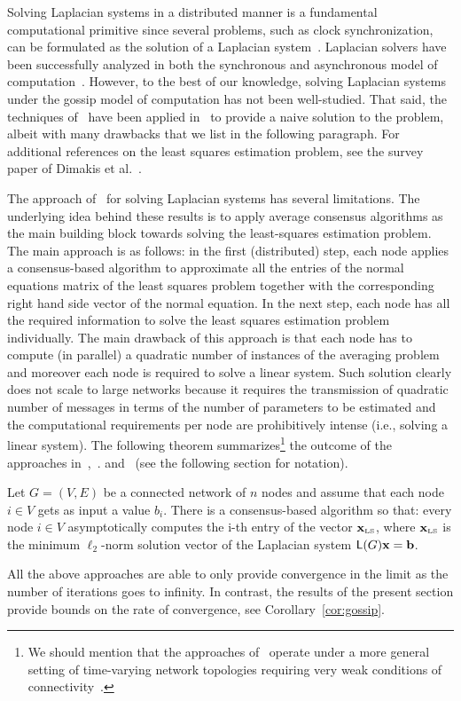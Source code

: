 Solving Laplacian systems in a distributed manner is a fundamental computational primitive since several problems, such as clock synchronization, can be formulated as the solution of a Laplacian system~\cite{smoothing,karp,CDC12}. Laplacian solvers have been successfully analyzed in both the synchronous and asynchronous model of computation~\cite{gossip:TBA86}. However, to the best of our knowledge, solving Laplacian systems under the gossip model of computation has not been well-studied. That said, the techniques of~\cite{gossip:Boyd} have been applied in~\cite{gossip:Bolognani,gossip:IPSN05_Boyd,gossip:IPSN06_LS} to provide a naive solution to the problem, albeit with many drawbacks that we list in the following paragraph. For additional references on the least squares estimation problem, see the survey paper of Dimakis et al.~\cite[\S~IV]{gossip:Dimakis}.

The approach of~\cite{gossip:Bolognani,gossip:IPSN05_Boyd,gossip:IPSN06_LS} for solving Laplacian systems has several limitations. The underlying idea behind these results is to apply average consensus algorithms as the main building block towards solving the least-squares estimation problem. The main approach is as follows: in the first (distributed) step, each node applies a consensus-based algorithm to approximate all the entries of the normal equations matrix of the least squares problem together with the corresponding right hand side vector of the normal equation. In the next step, each node has all the required information to solve the least squares estimation problem individually. The main drawback of this approach is that each node has to compute (in parallel) a quadratic number of instances of the averaging problem and moreover each node is required to solve a linear system. Such solution clearly does not scale to large networks because it requires the transmission of quadratic number of messages in terms of the number of parameters to be estimated and the computational requirements per node are prohibitively intense (i.e., solving a linear system).  The following theorem summarizes\footnote{We should mention that the approaches of~\cite{gossip:Bolognani,gossip:IPSN05_Boyd,gossip:IPSN06_LS} operate under a more general setting of time-varying network topologies requiring very weak conditions of connectivity~\cite{gossip:IPSN06_LS}.} the outcome of the approaches in~\cite[\S~IV-A]{gossip:IPSN05_Boyd},~\cite{gossip:IPSN06_LS}. and~\cite[Theorem~5]{gossip:Bolognani} (see the following section for notation).
\begin{theorem}\cite[Theorem~5]{gossip:Bolognani}
	Let $G=(V,E)$ be a connected network of $n$ nodes and assume that each node $i\in V$ gets as input a value $b_i$. There is a consensus-based algorithm so that: every node $i\in V$ asymptotically computes the i-th entry of the vector $\mathbf{x}_{\textrm{\tiny LS}}$, where $\mathbf{x}_{\textrm{\tiny LS}}$ is the minimum $\ell_2$-norm solution vector of the Laplacian system ${\mathsf{L} } (G) \mathbf{x} = {\mathbf b}$.
\end{theorem}
All the above approaches are able to only provide convergence in the limit as the number of iterations goes to infinity. In contrast, the results of the present section provide bounds on the rate of convergence, see Corollary~\ref{cor:gossip}.
%
